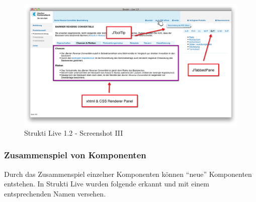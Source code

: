   \begin{figure}[htb]
    \begin{center}
      \includegraphics[width=\textwidth]{./image/SL/SL-03.png}
      \caption{Strukti Live 1.2 - Screenshot III}
      \label{img:SL-03}
    \end{center}
  \end{figure}
  
  \subsubsection{Zusammenspiel von Komponenten}

  Durch das Zusammenspiel einzelner Komponenten können ``neue'' Komponenten
  entstehen. In Strukti Live wurden folgende erkannt und mit einem
  entsprechenden Namen versehen.
  
